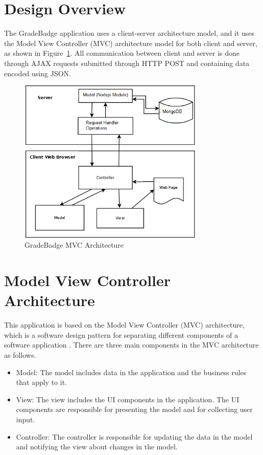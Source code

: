 \lstset{breaklines=true}

\section{Design Overview}
The GradeBadge application uses a client-server architecture model, and it uses the Model View Controller (MVC) architecture model for both client and server, as shown in Figure~\ref{fig:mvc}.  All communication between client and server is done through AJAX requests submitted through HTTP POST and containing data encoded using JSON. 

\vspace{3em}
\begin{figure}[H]
\begin{center}
\includegraphics[height=3.1in,width=3.5in]{images/mvc_diagram.png}
\caption{GradeBadge MVC Architecture}
\label{fig:mvc}
\end{center}
\end{figure}   

\section{Model View Controller Architecture}
This application is based on the Model View Controller (MVC) architecture,
which is a software design pattern for separating different components of a software application \cite{MVC}. There are three main components in the MVC architecture as follows.

\begin{itemize}
\item Model: The model includes data in the application and the business rules that apply to it.
\item View: The view includes the UI components in the application. The UI components are responsible for presenting the model and for collecting user input.
\item Controller: The controller is responsible for updating the data in the model and notifying the view about changes in the model.
\end{itemize}

